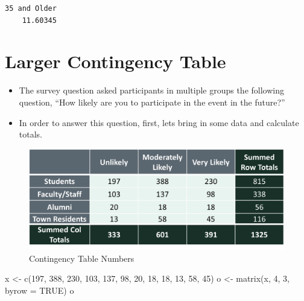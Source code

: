 \documentclass[
  letterpaper,
  DIV=11,
  numbers=noendperiod]{scrreprt}
\newenvironment{Shaded}{\begin{snugshade}}{\end{snugshade}}
\newcommand{\AttributeTok}[1]{\textcolor[rgb]{0.40,0.45,0.13}{#1}}
\newcommand{\ConstantTok}[1]{\textcolor[rgb]{0.56,0.35,0.01}{#1}}
\newcommand{\DecValTok}[1]{\textcolor[rgb]{0.68,0.00,0.00}{#1}}
\newcommand{\FunctionTok}[1]{\textcolor[rgb]{0.28,0.35,0.67}{#1}}
\newcommand{\NormalTok}[1]{\textcolor[rgb]{0.00,0.23,0.31}{#1}}
\newcommand{\OtherTok}[1]{\textcolor[rgb]{0.00,0.23,0.31}{#1}}
\providecommand{\tightlist}{%
  \setlength{\itemsep}{0pt}\setlength{\parskip}{0pt}}\usepackage{longtable,booktabs,array}
\begin{document}
\begin{verbatim}
35 and Older 
    11.60345 
\end{verbatim}

\section{Larger Contingency Table}\label{larger-contingency-table}

\begin{itemize}
\tightlist
\item
  The survey question asked participants in multiple groups the
  following question, ``How likely are you to participate in the event
  in the future?''
\item
  In order to answer this question, first, lets bring in some data and
  calculate totals.
\end{itemize}

\begin{figure}[H]

{\centering \includegraphics{Pictures/Ch5/ConTblNum.png}

}

\caption{Contingency Table Numbers}

\end{figure}%

\begin{Shaded}
\begin{Highlighting}[]
\NormalTok{x }\OtherTok{\textless{}{-}} \FunctionTok{c}\NormalTok{(}\DecValTok{197}\NormalTok{, }\DecValTok{388}\NormalTok{, }\DecValTok{230}\NormalTok{, }\DecValTok{103}\NormalTok{, }\DecValTok{137}\NormalTok{, }\DecValTok{98}\NormalTok{, }\DecValTok{20}\NormalTok{, }\DecValTok{18}\NormalTok{, }\DecValTok{18}\NormalTok{, }\DecValTok{13}\NormalTok{, }\DecValTok{58}\NormalTok{, }\DecValTok{45}\NormalTok{)}
\NormalTok{o }\OtherTok{\textless{}{-}} \FunctionTok{matrix}\NormalTok{(x, }\DecValTok{4}\NormalTok{, }\DecValTok{3}\NormalTok{, }\AttributeTok{byrow =} \ConstantTok{TRUE}\NormalTok{)}
\NormalTok{o}
\end{Highlighting}
\end{Shaded}
\end{document}
